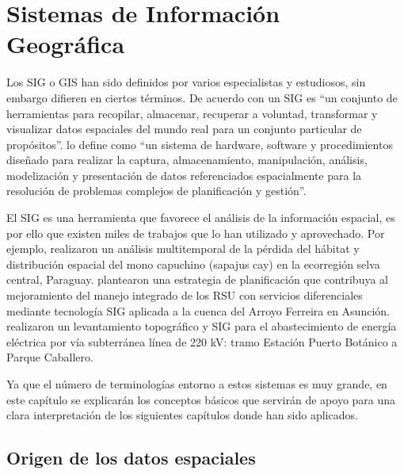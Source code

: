 \chapter{Sistemas de Información Geográfica}
\label{chap3}
\ifpdf
    \graphicspath{{Chapter3/Chapter3Figs/PNG/}{Chapter3/Chapter3Figs/PDF/}{Chapter3/Chapter3Figs/}}
\else
    \graphicspath{{Chapter3/Chapter3Figs/EPS/}{Chapter3/Chapter3Figs/}}
\fi


Los SIG o GIS han sido definidos por varios especialistas y estudiosos, sin embargo difieren en ciertos términos. De acuerdo con \citet{Burrough1986PrinciplesAssessment} un SIG es “un conjunto de herramientas para recopilar, almacenar, recuperar a voluntad, transformar y visualizar datos espaciales del mundo real para un conjunto particular de propósitos”. \citet{NCGIA1990IntroductionGIS} lo define como “un sistema de hardware, software y procedimientos diseñado para realizar la captura, almacenamiento, manipulación, análisis, modelización y presentación de datos referenciados espacialmente para la resolución de problemas complejos de planificación y gestión”.

El SIG es una herramienta que favorece el análisis de la información espacial, es por ello que existen miles de trabajos que lo han utilizado y aprovechado. Por ejemplo, \citet{OsorioDominguez2018AnalisisParaguay} realizaron un análisis multitemporal de la pérdida del hábitat y distribución espacial del mono capuchino (sapajus cay) en la ecorregión selva central, Paraguay. \citet{Cabral2018EstrategiasAsuncion} plantearon una estrategia de planificación que contribuya al mejoramiento del manejo integrado de los RSU con servicios diferenciales mediante tecnología SIG aplicada a la cuenca del Arroyo Ferreira en Asunción. \citet{Acosta2006LevantamientoCaballero} realizaron un levantamiento topográfico y SIG para el abastecimiento de energía eléctrica por vía subterránea línea de 220 kV: tramo Estación Puerto Botánico a Parque Caballero.

Ya que el número de terminologías entorno a estos sistemas es muy grande, en este capítulo se explicarán los conceptos básicos que servirán de apoyo para una clara interpretación de los siguientes capítulos donde han sido aplicados.

\section{Origen de los datos espaciales}

